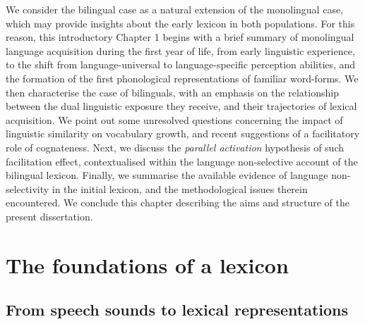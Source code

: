 \documentclass[
  12pt,
  b5paperpaper,
  twoside]{scrreprt}
\begin{document}
We consider the bilingual case as a natural extension of the monolingual
case, which may provide insights about the early lexicon in both
populations. For this reason, this introductory Chapter 1 begins with a
brief summary of monolingual language acquisition during the first year
of life, from early linguistic experience, to the shift from
language-universal to language-specific perception abilities, and the
formation of the first phonological representations of familiar
word-forms. We then characterise the case of bilinguals, with an
emphasis on the relationship between the dual linguistic exposure they
receive, and their trajectories of lexical acquisition. We point out
some unresolved questions concerning the impact of linguistic similarity
on vocabulary growth, and recent suggestions of a facilitatory role of
cognateness. Next, we discuss the \emph{parallel activation} hypothesis
of such facilitation effect, contextualised within the language
non-selective account of the bilingual lexicon. Finally, we summarise
the available evidence of language non-selectivity in the initial
lexicon, and the methodological issues therein encountered. We conclude
this chapter describing the aims and structure of the present
dissertation.

\hypertarget{the-foundations-of-a-lexicon}{%
\section{The foundations of a
lexicon}\label{the-foundations-of-a-lexicon}}

\hypertarget{from-speech-sounds-to-lexical-representations}{%
\subsection{From speech sounds to lexical
representations}\label{from-speech-sounds-to-lexical-representations}}
\end{document}
